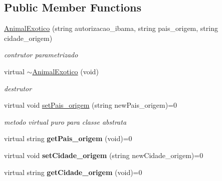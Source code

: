 \subsection*{Public Member Functions}
\begin{DoxyCompactItemize}
\item 
\mbox{\label{class_animal_exotico_ab7fec7af89d79c9211ff32dfa794cabb}} 
\mbox{\hyperlink{class_animal_exotico_ab7fec7af89d79c9211ff32dfa794cabb}{Animal\+Exotico}} (string autorizacao\+\_\+ibama, string pais\+\_\+origem, string cidade\+\_\+origem)
\begin{DoxyCompactList}\small\item\em contrutor parametrizado \end{DoxyCompactList}\item 
\mbox{\label{class_animal_exotico_a4ab151d9e9c55c33c23cbec60dda4687}} 
virtual \mbox{\hyperlink{class_animal_exotico_a4ab151d9e9c55c33c23cbec60dda4687}{$\sim$\+Animal\+Exotico}} (void)
\begin{DoxyCompactList}\small\item\em destrutor \end{DoxyCompactList}\item 
\mbox{\label{class_animal_exotico_a496013ecefb3cafb33537bb4022728e2}} 
virtual void \mbox{\hyperlink{class_animal_exotico_a496013ecefb3cafb33537bb4022728e2}{set\+Pais\+\_\+origem}} (string new\+Pais\+\_\+origem)=0
\begin{DoxyCompactList}\small\item\em metodo virtual puro para classe abstrata \end{DoxyCompactList}\item 
\mbox{\label{class_animal_exotico_abdcaaecf996e9854c1a0d900944bcc0d}} 
virtual string {\bfseries get\+Pais\+\_\+origem} (void)=0
\item 
\mbox{\label{class_animal_exotico_a92ccf3a6fc598e48eba64c5fe4e3ae37}} 
virtual void {\bfseries set\+Cidade\+\_\+origem} (string new\+Cidade\+\_\+origem)=0
\item 
\mbox{\label{class_animal_exotico_ae97dc597dbeddf0d4388d1df9802fcde}} 
virtual string {\bfseries get\+Cidade\+\_\+origem} (void)=0

\end{DoxyCompactItemize}
